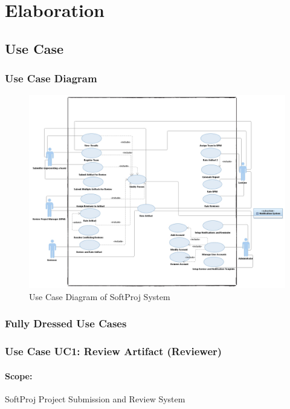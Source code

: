 \chapter{Elaboration}
\label{sec:related}

\hspace{0pt}
\vfill

\section{Use Case}
\subsection{Use Case Diagram}

\begin{figure}[h]
\includegraphics[width=17cm]{UseCase.jpeg}
\centering
\caption{Use Case Diagram of SoftProj System}
\end{figure}


\vfill
\hspace{0pt}
\pagebreak

\subsection{Fully Dressed Use Cases}
    \subsection*{Use Case UC1: Review Artifact (Reviewer)}
    \subsubsection*{Scope:} SoftProj Project Submission and Review System
